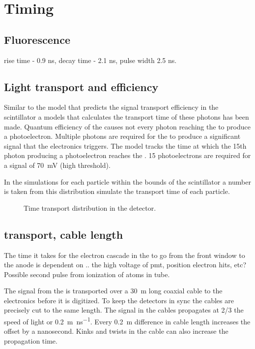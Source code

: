 \section{Timing}

\subsection{Fluorescence}

rise time - 0.9 ns, decay time - 2.1 ns, pulse width 2.5 ns.



\subsection{Light transport and \pmt efficiency}

Similar to the model that predicts the signal transport efficiency in
the scintillator a models that calculates the transport time of these
photons has been made. Quantum efficiency of the \pmt causes not every
photon reaching the \pmt to produce a photoelectron. Multiple photons
are required for the \pmt to produce a significant signal that the
\hisparc electronics triggers. The model tracks the time at which the
15th photon producing a photoelectron reaches the \pmt. 15
photoelectrons are required for a signal of \SI{70}{\milli\volt} (high
threshold).

In the simulations for each particle within the bounds of the
scintillator a number is taken from this distribution simulate the
transport time of each particle.

\begin{figure}
    \centering
    
    \caption{ Time transport
             distribution in the detector.}
    \label{fig:transport_time}
\end{figure}


\subsection{\pmt transport, cable length}

The time it takes for the electron cascade in the \pmt to go from the
front window to the anode is dependent on .. the high voltage of pmt,
position electron hits, etc? Possible second pulse from ionization of
atoms in tube.

The signal from the \pmt is transported over a \SI{30}{\meter} long
coaxial cable to the \hisparc electronics before it is digitized. To
keep the detectors in sync the cables are precisely cut to the
same length. The signal in the cables propagates at 2/3 the speed of
light or \SI{.2}{\meter\per\nano\second}. Every \SI{.2}{\meter}
difference in cable length increases the offset by a nanosecond. Kinks
and twists in the cable can also increase the propagation time.

